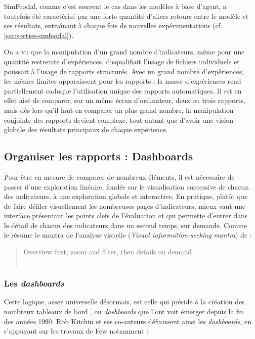 	SimFeodal, comme c'est souvent le cas dans les modèles à base d'agent, a toutefois été caractérisé par une forte quantité d'allers-retours entre le modèle et ses résultats, entraînant à chaque fois de nouvelles expérimentations (cf. \cref{sec:sorties-simfeodal}). 
	
	On a vu que la manipulation d'un grand nombre d'indicateurs, même pour une quantité restreinte d'expériences, disqualifiait l'usage de fichiers individuels et poussait à l'usage de rapports structurés.
	Avec un grand nombre d'expériences, les mêmes limites apparaissent pour les rapports : la masse d'expériences rend partiellement caduque l'utilisation unique des rapports automatiques.
	Il est en effet aisé de comparer, sur un même écran d'ordinateur, deux ou trois rapports, mais dès lors qu'il faut en comparer un plus grand nombre, la manipulation conjointe des rapports devient complexe, tout autant que d'avoir une vision globale des résultats principaux de chaque expérience.

\clearpage
	\subsection{Organiser les rapports : Dashboards}\label{subsec:dashboards}

	Pour être en mesure de comparer de nombreux éléments, il est nécessaire de passer d'une exploration linéaire, fondée sur le visualisation successive de chacun des indicateurs, à une exploration globale et interactive.
	En pratique, plutôt que de faire défiler visuellement les nombreuses pages d'indicateurs, mieux vaut une interface présentant les points clefs de l'évaluation et qui permette d'entrer dans le détail de chacun des indicateurs dans un second temps, sur demande.
	Comme le résume le \og mantra\fg{} de l'analyse visuelle (\og \textit{Visual information-seeking mantra}\fg{}) de  :
\begin{quote}
	\centering
	\og Overview first, zoom and filter, then details on demand\fg{}\\
	\mbox{}~ \hfill \cite[\ppno~2]{shneiderman1996eyes}
\end{quote}
	

	\subsubsection{Les \textit{dashboards}}

	Cette logique, assez universelle désormais, est celle qui préside à la création des nombreux \og tableaux de bord \fg{}, ou \og \textit{dashboards} \fg{} que l'ont voit émerger depuis la fin des années 1990.
	Rob Kitchin et ses co-auteurs définissent ainsi les \textit{dashboards}, en s'appuyant sur les travaux de Few notamment :

